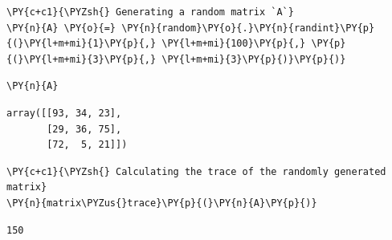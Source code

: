     \begin{tcolorbox}[breakable, size=fbox, boxrule=1pt, pad at break*=1mm,colback=cellbackground, colframe=cellborder]
\begin{Verbatim}[commandchars=\\\{\}]
\PY{c+c1}{\PYZsh{} Generating a random matrix `A`}
\PY{n}{A} \PY{o}{=} \PY{n}{random}\PY{o}{.}\PY{n}{randint}\PY{p}{(}\PY{l+m+mi}{1}\PY{p}{,} \PY{l+m+mi}{100}\PY{p}{,} \PY{p}{(}\PY{l+m+mi}{3}\PY{p}{,} \PY{l+m+mi}{3}\PY{p}{)}\PY{p}{)}
\end{Verbatim}
\end{tcolorbox}

    \begin{tcolorbox}[breakable, size=fbox, boxrule=1pt, pad at break*=1mm,colback=cellbackground, colframe=cellborder]
\begin{Verbatim}[commandchars=\\\{\}]
\PY{n}{A}
\end{Verbatim}
\end{tcolorbox}

            \begin{tcolorbox}[breakable, size=fbox, boxrule=.5pt, pad at break*=1mm, opacityfill=0]
\begin{Verbatim}[commandchars=\\\{\}]
array([[93, 34, 23],
       [29, 36, 75],
       [72,  5, 21]])
\end{Verbatim}
\end{tcolorbox}
        
    \begin{tcolorbox}[breakable, size=fbox, boxrule=1pt, pad at break*=1mm,colback=cellbackground, colframe=cellborder]
\begin{Verbatim}[commandchars=\\\{\}]
\PY{c+c1}{\PYZsh{} Calculating the trace of the randomly generated matrix}
\PY{n}{matrix\PYZus{}trace}\PY{p}{(}\PY{n}{A}\PY{p}{)}
\end{Verbatim}
\end{tcolorbox}

            \begin{tcolorbox}[breakable, size=fbox, boxrule=.5pt, pad at break*=1mm, opacityfill=0]
\begin{Verbatim}[commandchars=\\\{\}]
150
\end{Verbatim}
\end{tcolorbox}
        
